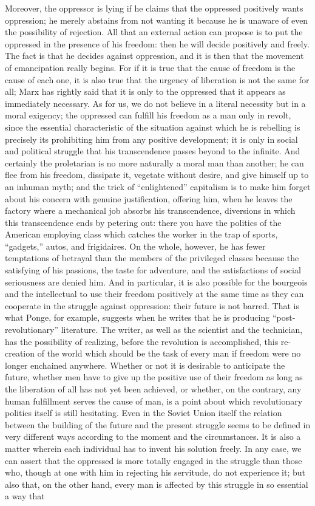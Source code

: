 \documentclass[11pt]{article}
\begin{document}
{{Moreover, the oppressor is lying if he claims that the oppressed positively wants oppression; he merely abstains from not wanting it because he is unaware of even the possibility of rejection. All that an external action can propose is to put the oppressed in the presence of his freedom: then he will decide positively and freely. The fact is that he decides against oppression, and it is then that the movement of emancipation really begins. For if it is true that the cause of freedom is the cause of each one, it is also true that the urgency of liberation is not the same for all; Marx has rightly said that it is only to the oppressed that it appears as immediately necessary. As for us, we do not believe in a literal necessity but in a moral exigency; the oppressed can fulfill his freedom as a man only in revolt, since the essential characteristic of the situation against which he is rebelling is precisely its prohibiting him from any positive development; it is only in social and political struggle that his transcendence passes beyond to the infinite. And certainly the proletarian is no more naturally a moral man than another; he can flee from his freedom, dissipate it, vegetate without desire, and give himself up to an inhuman myth; and the trick of “enlightened” capitalism is to make him forget about his concern with genuine justification, offering him, when he leaves the factory where a mechanical job absorbs his transcendence, diversions in which this transcendence ends by petering out: there you have the politics of the American employing class which catches the worker in the trap of sports, “gadgets,” autos, and frigidaires. On the whole, however, he has fewer temptations of betrayal than the members of the privileged classes because the satisfying of his passions, the taste for adventure, and the satisfactions of social seriousness are denied him. And in particular, it is also possible for the bourgeois and the intellectual to use their freedom positively at the same time as they can cooperate in the struggle against oppression: their future is not barred. That is what Ponge, for example, suggests when he writes that he is producing “post-revolutionary” literature. The writer, as well as the scientist and the technician, has the possibility of realizing, before the revolution is accomplished, this re-creation of the world which should be the task of every man if freedom were no longer enchained anywhere. Whether or not it is desirable to anticipate the future, whether men have to give up the positive use of their freedom as long as the liberation of all has not yet been achieved, or whether, on the contrary, any human fulfillment serves the cause of man, is a point about which revolutionary politics itself is still hesitating. Even in the Soviet Union itself the relation between the building of the future and the present struggle seems to be defined in very different ways according to the moment and the circumstances. It is also a matter wherein each individual has to invent his solution freely. In any case, we can assert that the oppressed is more totally engaged in the struggle than those who, though at one with him in rejecting his servitude, do not experience it; but also that, on the other hand, every man is affected by this struggle in so essential a way that }}
\end{document}
